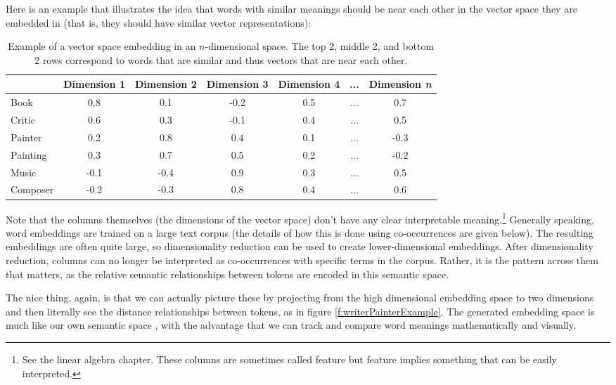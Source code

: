 Here is an example that illustrates the idea that words with similar meanings should be near each other in the vector space they are embedded in (that is, they should have similar vector representations):
\begin{table}[h]
    \centering
    \begin{tabular}{|l|c|c|c|c|c|c|}
    \hline
     & Dimension 1 & Dimension 2 & Dimension 3 & Dimension 4 & ... & Dimension \textit{n} \\
    \hline
    Book    & 0.8 & 0.1 & -0.2 & 0.5 & ... & 0.7  \\
    \hline
    Critic  & 0.6 & 0.3 & -0.1 & 0.4 & ... & 0.5  \\
    \hline
    Painter & 0.2 & 0.8 & 0.4 & 0.1 & ... & -0.3 \\
    \hline
    Painting& 0.3 & 0.7 & 0.5 & 0.2 & ... & -0.2  \\
    \hline
    Music   & -0.1 & -0.4 & 0.9 & 0.3 & ... & 0.5  \\
    \hline
    Composer& -0.2 & -0.3 & 0.8 & 0.4 & ... & 0.6 \\
    \hline
    \end{tabular}
    \caption{Example of a vector space embedding in an $n$-dimensional space. The top 2, middle 2, and bottom 2 rows correspond to words that are similar and thus vectors that are near each other.}
    \label{exampleEmbeddings}
\end{table}

Note that the columns themselves (the dimensions of the vector space) don't have any clear interpretable meaning.\footnote{See the linear algebra chapter. These columns are sometimes called feature but feature implies something that can be easily interpreted.} Generally speaking, word embeddings are trained on a large text corpus (the details of how this is done using co-occurrences are given below). The resulting embeddings are often quite large, so dimensionality reduction can be used to create lower-dimensional embeddings. After dimensionality reduction, columns can no longer be interpreted as co-occurrences with specific terms in the corpus. Rather, it is the pattern across them that matters, as the relative semantic relationships between tokens are encoded in this semantic space. 

The nice thing, again, is that we can actually picture these by projecting from the high dimensional embedding space to two dimensions and then literally see the distance relationships between tokens, as in figure \ref{f:writerPainterExample}. The generated embedding space is much like our own semantic space \cite{lewis2019distributional}, with the advantage that we can track and compare word meanings mathematically and visually.

